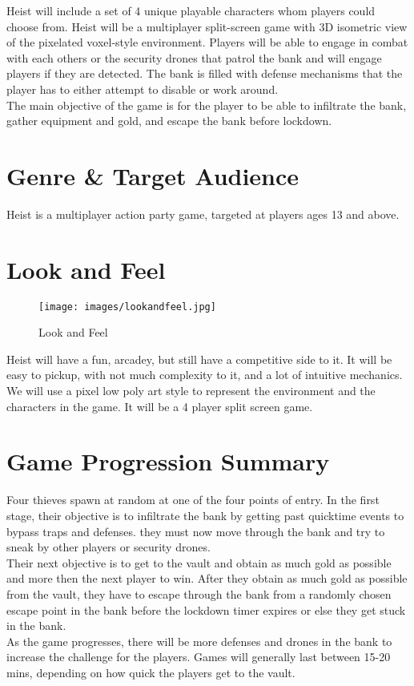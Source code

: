 \documentclass[10pt]{report}
\begin{document}
Heist will include a set of 4 unique playable characters whom players could choose from. Heist will be a multiplayer split-screen game with 3D isometric view of the pixelated voxel-style environment. Players will be able to engage in combat with each others or the security drones that patrol the bank and will engage players if they are detected. The bank is filled with defense mechanisms that the player has to either attempt to disable or work around.\\
The main objective of the game is for the player to be able to infiltrate the bank, gather equipment and gold, and escape the bank before lockdown.

\section{Genre \& Target Audience}

Heist is a multiplayer action party game, targeted at players ages 13 and above.

\section{Look and Feel}

\begin{figure}[H]
    \centering
    \texttt{[image: images/lookandfeel.jpg]}
    \caption{Look and Feel}
\end{figure}

Heist will have a fun, arcadey, but still have a competitive side to it. It will be easy to pickup, with not much complexity to it, and a lot of intuitive mechanics. We will use a pixel low poly art style to represent the environment and the characters in the game. It will be a 4 player split screen game.

\section{Game Progression Summary}

Four thieves spawn at random at one of the four points of entry. In the first stage, their objective is to infiltrate the bank by getting past quicktime events to bypass traps and defenses. they must now move through the bank and try to sneak by other players or security drones. \\
Their next objective is to get to the vault and obtain as much gold as possible and more then the next player to win. After they obtain as much gold as possible from the vault, they have to escape through the bank from a randomly chosen escape point in the bank before the lockdown timer expires or else they get stuck in the bank. \\
As the game progresses, there will be more defenses and drones in the bank to increase the challenge for the players. Games will generally last between 15-20 mins, depending on how quick the players get to the vault.
\end{document}
